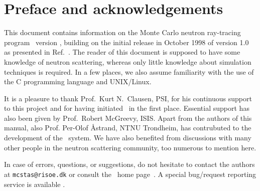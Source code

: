 
\chapter*{Preface and acknowledgements}
This document contains information on the Monte Carlo neutron
ray-tracing program \MCS\ version \version, building on the initial
release in October 1998 of version 1.0 as presented in Ref.~\cite{nn_10_20}. The reader of this
document is supposed to have some knowledge of neutron scattering,
whereas only little knowledge about simulation techniques is
required. In a few places, we also assume familiarity with the
use of the C programming language and UNIX/Linux.

It is a pleasure to thank Prof.~Kurt N.~Clausen, PSI, for his continuous
support to this project and for having initiated \MCS\ in the first
place. Essential support has also been given by Prof.~Robert McGreevy, ISIS.
Apart from the authors of this manual, also Prof. Per-Olof \AA strand, NTNU Trondheim,
has contrubuted to the development of the \MCS\ system.
We have also benefited
from discussions with many other people in the neutron scattering
community, too numerous to mention here.


In case of errors, questions, or suggestions,
do not hesitate to
contact the authors at \verb+mcstas@risoe.dk+
or consult the \MCS\ home page~\cite{mcstas_webpage}.
A special bug/request reporting service is available \cite{mczilla_webpage}.

